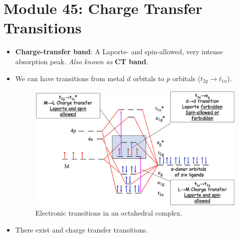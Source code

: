 \documentclass[../notes.tex]{subfiles}
\begin{document}
\section{Module 45: Charge Transfer Transitions}
\begin{itemize}
    \item \textbf{Charge-transfer band}: A Laporte- and spin-allowed, very intense absorption peak. \emph{Also known as} \textbf{CT band}.
    \item We can have transitions from metal $d$ orbitals to $p$ orbitals ($t_{2g}\to t_{1u}$).
    \begin{figure}[h!]
        \centering
        \includegraphics[width=0.8\linewidth]{../ExtFiles/chargeTransferTransitions.png}
        \caption{Electronic transitions in an octahedral complex.}
        \label{fig:chargeTransferTransitions}
    \end{figure}
    \item There exist  and  charge transfer transitions.
\end{itemize}
\end{document}
